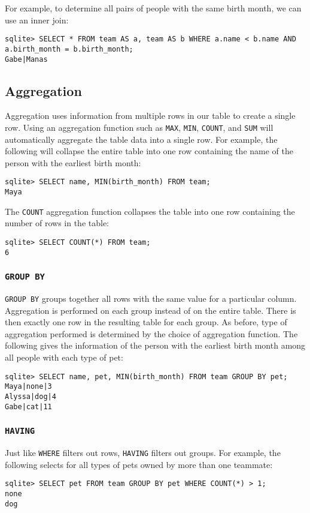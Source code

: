 For example, to determine all pairs of people with the same birth month, we can use an inner join: 
\begin{lstlisting}
sqlite> SELECT * FROM team AS a, team AS b WHERE a.name < b.name AND a.birth_month = b.birth_month;
Gabe|Manas
\end{lstlisting}

\subsection{Aggregation}
Aggregation uses information from multiple rows in our table to create a single row. Using an aggregation function such as \lstinline{MAX}, \lstinline{MIN}, \lstinline{COUNT}, and \lstinline{SUM} will automatically aggregate the table data into a single row. For example, the following will collapse the entire table into one row containing the name of the person with the earliest birth month: 
\begin{lstlisting}
sqlite> SELECT name, MIN(birth_month) FROM team; 
Maya
\end{lstlisting}

The \lstinline{COUNT} aggregation function collapses the table into one row containing the number of rows in the table: 
\begin{lstlisting}
sqlite> SELECT COUNT(*) FROM team; 
6
\end{lstlisting}

\subsubsection{\lstinline{GROUP BY}}
\lstinline{GROUP BY} groups together all rows with the same value for a particular column. Aggregation is performed on each group instead of on the entire table. There is then exactly one row in the resulting table for each group. As before, type of aggregation performed is determined by the choice of aggregation function. The following gives the information of the person with the earliest birth month among all people with each type of pet: 
\begin{lstlisting}
sqlite> SELECT name, pet, MIN(birth_month) FROM team GROUP BY pet; 
Maya|none|3
Alyssa|dog|4
Gabe|cat|11
\end{lstlisting}

\subsubsection{\lstinline{HAVING}}
Just like \lstinline{WHERE} filters out rows, \lstinline{HAVING} filters out groups. For example, the following selects for all types of pets owned by more than one teammate: 
\begin{lstlisting}
sqlite> SELECT pet FROM team GROUP BY pet WHERE COUNT(*) > 1; 
none
dog
\end{lstlisting}

